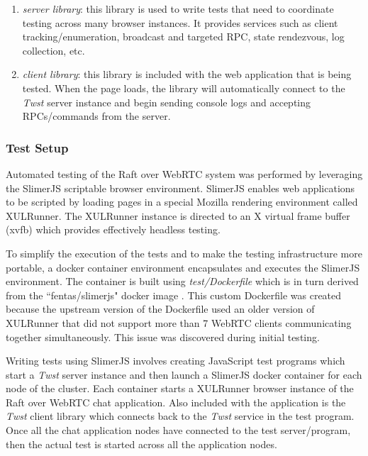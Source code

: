 \documentclass[conference,compsoc]{./IEEEtran/IEEEtran}
\begin{document}
\begin{enumerate}
    \item \emph{server library}: this library is used to write tests
        that need to coordinate testing across many browser instances.
        It provides services such as client tracking/enumeration,
        broadcast and targeted RPC, state rendezvous, log collection,
        etc.
    \item \emph{client library}: this library is included with the web
        application that is being tested. When the page loads, the
        library will automatically connect to the \emph{Twst} server
        instance and begin sending console logs and accepting
        RPCs/commands from the server.
\end{enumerate}


\subsubsection{Test Setup}

Automated testing of the Raft over WebRTC system was performed by
leveraging the SlimerJS scriptable browser environment. SlimerJS
enables web applications to be scripted by loading pages in a special
Mozilla rendering environment called XULRunner. The XULRunner instance
is directed to an X virtual frame buffer (xvfb) which provides
effectively headless testing.

To simplify the execution of the tests and to make the testing
infrastructure more portable, a docker container environment
encapsulates and executes the SlimerJS environment. The container is
built using \emph{test/Dockerfile} which is in turn derived from the
``fentas/slimerjs" docker image \cite{fentas:slimerjs}.
This custom Dockerfile was created because the upstream version of the
Dockerfile used an older version of XULRunner that did not support
more than 7 WebRTC clients communicating together simultaneously. This
issue was discovered during initial testing.

Writing tests using SlimerJS involves creating JavaScript test
programs which start a \emph{Twst} server instance and then launch a SlimerJS
docker container for each node of the cluster. Each container starts
a XULRunner browser instance of the Raft over WebRTC chat application.
Also included with the application is the \emph{Twst} client library
which connects back to the \emph{Twst} service in the test program.
Once all the chat application nodes have connected to the test
server/program, then the actual test is started across all the
application nodes.
\end{document}
